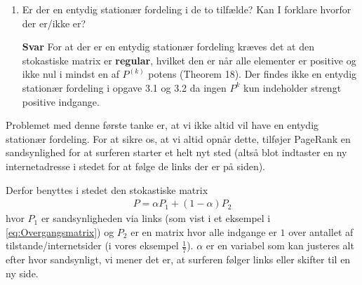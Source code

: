 \documentclass[10pt,a4paper]{article}
\begin{document}
\begin{enumerate}
	\item Er der en entydig stationær fordeling i de to tilfælde? Kan I forklare hvorfor der er/ikke er?
	\item[\textbf{Svar}] For at der er en entydig stationær fordeling kræves det at den stokastiske matrix er \textbf{regular}, hvilket den er når alle elementer er positive og ikke nul i mindst en af $P^{(k)}$ potens (Theorem 18). Der findes ikke en entydig stationær fordeling i opgave 3.1 og 3.2 da ingen $P^k$ kun indeholder strengt positive indgange.
\end{enumerate}

Problemet med denne første tanke er, at vi ikke altid vil have en entydig stationær fordeling. For at sikre os, at vi altid opnår dette, tilføjer PageRank en sandsynlighed for at surferen starter et helt nyt sted (altså blot indtaster en ny internetadresse i stedet for at følge de links der er på siden).

Derfor benyttes i stedet den stokastiske matrix
\begin{align}\label{eq:PRmatrix}
	P=\alpha P_1+(1-\alpha)P_2
\end{align}
hvor $P_1$ er sandsynligheden via links (som vist i et eksempel i \eqref{eq:Overgangsmatrix}) og $P_2$ er en matrix hvor alle indgange er $1$ over antallet af tilstande/internetsider (i vores eksempel $\frac{1}{7}$). $\alpha$ er en variabel som kan justeres alt efter hvor sandsynligt, vi mener det er, at surferen følger links eller skifter til en ny side.
\end{document}
